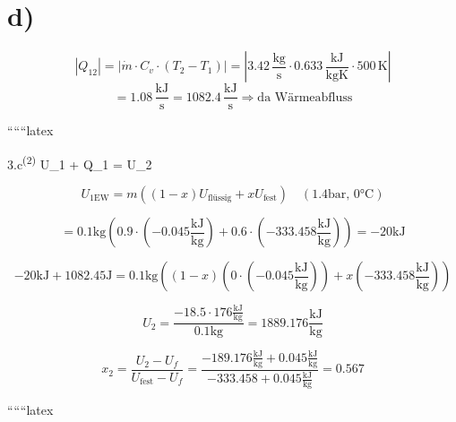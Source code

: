 

\section*{d)}
\[
\left| Q_{12} \right| = \left| \dot{m} \cdot C_v \cdot (T_2 - T_1) \right| = \left| 3.42 \, \frac{\text{kg}}{\text{s}} \cdot 0.633 \, \frac{\text{kJ}}{\text{kgK}} \cdot 500 \, \text{K} \right|
\]
\[
= 1.08 \, \frac{\text{kJ}}{\text{s}} = 1082.4 \, \frac{\text{kJ}}{\text{s}} \Rightarrow \text{da Wärmeabfluss}
\]

``````latex


3.c\textsuperscript{(2)} \quad U_{1} + Q_{1} = U_{2}

\[
U_{1\text{EW}} = m \left( (1-x) U_{\text{flüssig}} + x U_{\text{fest}} \right) \quad \left( 1.4 \text{bar, 0°C} \right)
\]

\[
= 0.1 \text{kg} \left( 0.9 \cdot (-0.045 \frac{\text{kJ}}{\text{kg}}) + 0.6 \cdot (-333.458 \frac{\text{kJ}}{\text{kg}}) \right) = -20 \text{kJ}
\]

\[
-20 \text{kJ} + 1082.45 \text{J} = 0.1 \text{kg} \left( (1-x) \left( 0 \cdot (-0.045 \frac{\text{kJ}}{\text{kg}}) \right) + x \left( -333.458 \frac{\text{kJ}}{\text{kg}} \right) \right)
\]

\[
U_2 = \frac{-18.5 \cdot 176 \frac{\text{kJ}}{\text{kg}}}{0.1 \text{kg}} = 1889.176 \frac{\text{kJ}}{\text{kg}}
\]

\[
x_2 = \frac{U_2 - U_f}{U_{\text{fest}} - U_f} = \frac{-189.176 \frac{\text{kJ}}{\text{kg}} + 0.045 \frac{\text{kJ}}{\text{kg}}}{-333.458 + 0.045 \frac{\text{kJ}}{\text{kg}}} = 0.567
\]

``````latex